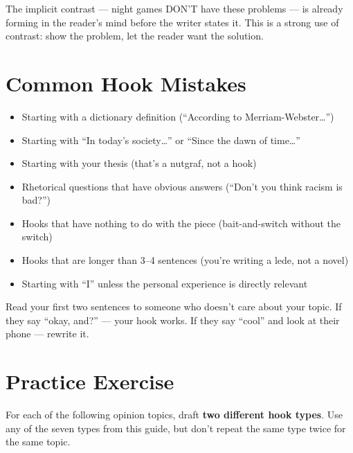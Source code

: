 \documentclass[12pt]{article}
\begin{document}
The implicit contrast --- night games DON'T have these problems --- is already forming in the reader's mind before the writer states it. This is a strong use of contrast: show the problem, let the reader want the solution.

\newpage

\section*{Common Hook Mistakes}

\begin{itemize}[leftmargin=*]
    \item Starting with a dictionary definition (``According to Merriam-Webster\ldots'')
    \item Starting with ``In today's society\ldots'' or ``Since the dawn of time\ldots''
    \item Starting with your thesis (that's a nutgraf, not a hook)
    \item Rhetorical questions that have obvious answers (``Don't you think racism is bad?'')
    \item Hooks that have nothing to do with the piece (bait-and-switch without the switch)
    \item Hooks that are longer than 3--4 sentences (you're writing a lede, not a novel)
    \item Starting with ``I'' unless the personal experience is directly relevant
\end{itemize}

\begin{tipbox}
Read your first two sentences to someone who doesn't care about your topic. If they say ``okay, and?'' --- your hook works. If they say ``cool'' and look at their phone --- rewrite it.
\end{tipbox}

\newpage

\section*{Practice Exercise}

For each of the following opinion topics, draft \textbf{two different hook types}. Use any of the seven types from this guide, but don't repeat the same type twice for the same topic.
\end{document}
